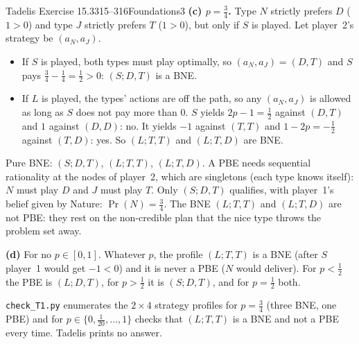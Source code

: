 \begin{exsol}{Tadelis Exercise 15.3}{315--316}{Foundations}{3}
\textbf{(c) $p = \frac34$.} Type $N$ strictly prefers $D$ ($1 > 0$) and type $J$ strictly prefers $T$
($1 > 0$), but only if $S$ is played. Let player~2's strategy be $(a_N, a_J)$.
\begin{itemize}
  \item If $S$ is played, both types must play optimally, so $(a_N, a_J) = (D, T)$ and $S$ pays
  $\frac34 - \frac14 = \frac12 > 0$: $(S; D, T)$ is a BNE.
  \item If $L$ is played, the types' actions are off the path, so any $(a_N, a_J)$ is allowed as
  long as $S$ does not pay more than $0$. $S$ yields $2p - 1 = \frac12$ against $(D,T)$ and $1$
  against $(D,D)$: no. It yields $-1$ against $(T,T)$ and $1 - 2p = -\frac12$ against $(T,D)$:
  yes. So $(L; T, T)$ and $(L; T, D)$ are BNE.
\end{itemize}
Pure BNE: $(S; D,T)$, $(L; T,T)$, $(L; T,D)$. A PBE needs sequential rationality at the
nodes of player~2, which are singletons (each type knows itself): $N$ must play $D$ and $J$ must
play $T$. Only $(S; D, T)$ qualifies, with player~1's belief given by Nature: $\Pr(N) = \frac34$.
The BNE $(L; T,T)$ and $(L; T,D)$ are not PBE: they rest on the non-credible plan that the nice
type throws the problem set away.

\textbf{(d)} For no $p \in [0,1]$. Whatever $p$, the profile $(L; T, T)$ is a BNE (after $S$ player~1
would get $-1 < 0$) and it is never a PBE ($N$ would deliver). For $p < \frac12$ the PBE is $(L; D, T)$,
for $p > \frac12$ it is $(S; D, T)$, and for $p = \frac12$ both.

\verify \texttt{check\_T1.py} enumerates the $2 \times 4$ strategy profiles for $p = \frac34$
(three BNE, one PBE) and for $p \in \{0, \frac1{20}, \dots, 1\}$ checks that $(L; T, T)$ is a BNE
and not a PBE every time. Tadelis prints no answer.

\end{exsol}
